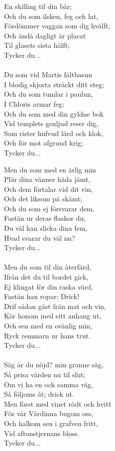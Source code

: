 En skilling til din bår;\\
Och du som ilsken, feg och lat,\\
Fördömmer vaggan som dig hvälft,\\
Och ändå dagligt är placat\\
Til glasets sista hälft;\\
Tycker du...\\
	\\		  
Du som vid Martis fältbasun\\
I blodig skjorta sträckt ditt steg;\\
Och du som tumlar i paulun,\\
I Chloris armar feg;\\
Och du som med din gyldne bok\\
Vid templets genljud reser dig,\\
Som rister hufvud lärd och klok,\\
Och för mot afgrund krig;\\
Tycker du...\par
\vspace{10pt}
Men du som med en ärlig min\\
Plär dina vänner häda jämt,\\
Och dem förtalar vid dit vin,\\
Och det liksom på skämt;\\
Och du som ej försvarar dem,\\
Fastän ur deras flaskor du,\\
Du väl kan slicka dina fem,\\
Hvad svarar du väl nu?\\
Tycker du...\\  
\\
Men du som til din återfärd,\\
Ifrån det du til bordet gick,\\
Ej klingat för din raska värd,\\
Fastän han ropar: Drick!\\
Drif sådan gäst från mat och vin,\\
Kör honom med sitt anhang ut,\\
Och sen med en ovänlig min,\\
Ryck remmarn ur hans trut.\\
Tycker du...\\
	\\				   
Säg är du nöjd? min granne säg,\\
Så prisa värden nu til slut;\\
Om vi ha en och samma väg,\\
Så följoms åt; drick ut.\\
Men först med vinet rödt och hvitt\\
För vår Värdinna bugom oss,\\
Och halkom sen i grafven fritt,\\
Vid aftonstjernans bloss.\\
Tycker du...
